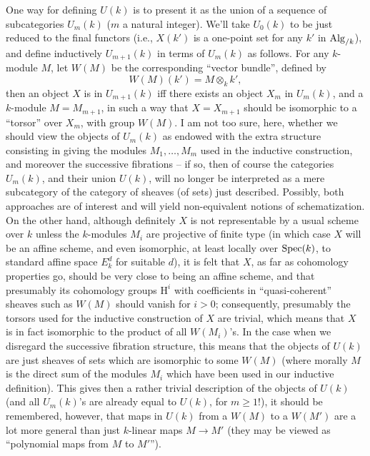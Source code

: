 One way for defining $U(k)$ is to present it as the union of a
sequence of subcategories $U_m(k)$ ($m$ a natural integer). We'll take
$U_0(k)$ to be just reduced to the final functors (i.e., $X(k')$ is a
one-point set for any $k'$ in $\operatorname{Alg}_{/k}$), and define inductively
$U_{m+1}(k)$ in terms of $U_m(k)$ as follows. For any $k$-module $M$,
let $W(M)$ be the corresponding ``vector bundle'', defined by
\begin{equation}
  \label{eq:111.g}
  W(M)(k')=M\otimes_k k',\tag{g}
\end{equation}
then an object $X$ is in $U_{m+1}(k)$ if{f} there exists an object $X_m$
in $U_m(k)$, and a $k$-module $M=M_{m+1}$, in such a way that
$X=X_{m+1}$ should be isomorphic to a ``torsor'' over $X_m$, with
group $W(M)$. I am not too sure, here, whether we should view the
objects of $U_m(k)$ as endowed with the extra structure consisting in
giving the modules $M_1,\dots,M_m$ used in the inductive construction,
and moreover the successive fibrations -- if so, then of course the
categories $U_m(k)$, and their union $U(k)$, will no longer be
interpreted as a mere subcategory of the category of
sheaves (of sets) just described. Possibly, both approaches are of
interest and will yield non-equivalent notions of schematization. On
the other hand, although definitely $X$ is not representable by a
usual scheme over $k$ unless the $k$-modules $M_i$ are projective of
finite type (in which case $X$ will be an affine scheme, and even
isomorphic, at least locally over $\operatorname{Spec}(k)$, to standard affine space
$E_k^d$ for suitable $d$), it is felt that $X$, as far as cohomology
properties go, should be very close to being an affine scheme, and
that presumably its cohomology groups $\mathrm H^i$ with coefficients
in ``quasi-coherent'' sheaves such as $W(M)$ should vanish for $i>0$;
consequently, presumably the torsors used for the inductive
construction of $X$ are trivial, which means that $X$ is in fact
isomorphic to the product of all $W(M_i)$'s. In the case when we
disregard the successive fibration structure, this means that the
objects of $U(k)$ are just sheaves of sets which are isomorphic to
some $W(M)$ (where morally $M$ is the direct sum of the modules $M_i$
which have been used in our inductive definition). This gives then a
rather trivial description of the objects of $U(k)$ (and all
$U_m(k)$'s are already equal to $U(k)$, for $m\ge1$!), it should be
remembered, however, that maps in $U(k)$ from a $W(M)$ to a $W(M')$
are a lot more general than just $k$-linear maps $M\to M'$ (they may
be viewed as ``polynomial maps from $M$ to $M'$'').

